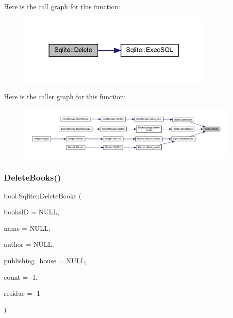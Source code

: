Here is the call graph for this function\+:
\nopagebreak
\begin{figure}[H]
\begin{center}
\leavevmode
\includegraphics[width=280pt]{class_sqlite_a772711beeceff7a567192e19abccfed4_cgraph}
\end{center}
\end{figure}
Here is the caller graph for this function\+:
\nopagebreak
\begin{figure}[H]
\begin{center}
\leavevmode
\includegraphics[width=350pt]{class_sqlite_a772711beeceff7a567192e19abccfed4_icgraph}
\end{center}
\end{figure}
\mbox{\label{class_sqlite_a8a83c22e036086edf84758fb0f6cfc56}} 
\subsubsection{\texorpdfstring{DeleteBooks()}{DeleteBooks()}}
{\footnotesize\ttfamily bool Sqlite\+::\+Delete\+Books (\begin{DoxyParamCaption}\item[{Q\+String}]{books\+ID = {\ttfamily NULL},  }\item[{Q\+String}]{name = {\ttfamily NULL},  }\item[{Q\+String}]{author = {\ttfamily NULL},  }\item[{Q\+String}]{publishing\+\_\+house = {\ttfamily NULL},  }\item[{int}]{count = {\ttfamily -\/1},  }\item[{int}]{residue = {\ttfamily -\/1} }\end{DoxyParamCaption})}

